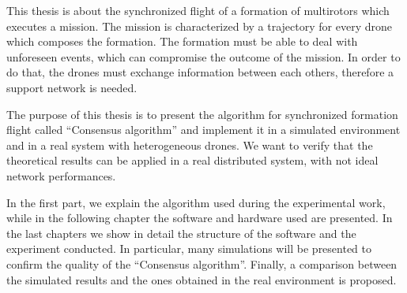 



This thesis is about the synchronized flight of a formation of multirotors which executes a mission.
The mission is characterized by a trajectory for every drone which composes the formation.
The formation must be able to deal with unforeseen events, which can compromise
the outcome of the mission. In order to do that, the drones must exchange information
between each others, therefore a support network is needed.

The purpose of this thesis is to present the algorithm for synchronized formation flight
called “Consensus algorithm” and implement it in a simulated environment
and in a real system with heterogeneous drones. We want to verify that the theoretical
results can be applied in a real distributed system, with not ideal network performances.

In the first part, we explain the algorithm used during the experimental work,
while in the following chapter the software and hardware used are presented.
In the last chapters we show in detail the structure of the software and the experiment conducted.
In particular, many simulations will be presented to confirm the quality of the
“Consensus algorithm”. Finally, a comparison between the simulated results and the ones
obtained in the real environment is proposed.
